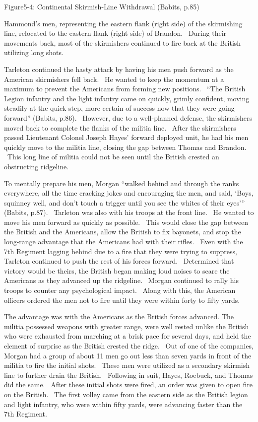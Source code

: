 			    Figure5-4: Continental Skirmish-Line Withdrawal
(Babits, p.85)



Hammond’s men, representing the eastern flank (right side) of the skirmishing
line, relocated to the eastern flank (right side) of Brandon.  During their
movements back, most of the skirmishers continued to fire back at the British
utilizing long shots.

Tarleton continued the hasty attack by having his men push forward as the
American skirmishers fell back.  He wanted to keep the momentum at a maximum to
prevent the Americans from forming new positions.  “The British Legion infantry
and the light infantry came on quickly, grimly confident, moving steadily at the
quick step, more certain of success now that they were going forward” (Babits,
p.86).  However, due to a well-planned defense, the skirmishers moved back to
complete the flanks of the militia line.  After the skirmishers passed
Lieutenant Colonel Joseph Hayes’ forward deployed unit, he had his men quickly
move to the militia line, closing the gap between Thomas and Brandon.  This long
line of militia could not be seen until the British crested an obstructing
ridgeline.  

To mentally prepare his men, Morgan “walked behind and through the ranks
everywhere, all the time cracking jokes and encouraging the men, and said,
‘Boys, squinney well, and don’t touch a trigger until you see the whites of
their eyes’” (Babits, p.87).  Tarleton was also with his troops at the front
line.  He wanted to move his men forward as quickly as possible.  This would
close the gap between the British and the Americans, allow the British to fix
bayonets, and stop the long-range advantage that the Americans had with their
rifles.  Even with the 7th Regiment lagging behind due to a fire that they were
trying to suppress, Tarleton continued to push the rest of his forces forward.
 Determined that victory would be theirs, the British began making loud noises
to scare the Americans as they advanced up the ridgeline.  Morgan continued to
rally his troops to counter any psychological impact.  Along with this, the
American officers ordered the men not to fire until they were within forty to
fifty yards.  

The advantage was with the Americans as the British forces advanced.  The
militia possessed weapons with greater range, were well rested unlike the
British who were exhausted from marching at a brisk pace for several days, and
held the element of surprise as the British crested the ridge.  Out of one of
the companies, Morgan had a group of about 11 men go out less than seven yards
in front of the militia to fire the initial shots.  These men were utilized as a
secondary skirmish line to further drain the British.  Following in suit, Hayes,
Roebuck, and Thomas did the same.  After these initial shots were fired, an
order was given to open fire on the British.  The first volley came from the
eastern side as the British legion and light infantry, who were within fifty
yards, were advancing faster than the 7th Regiment.  

